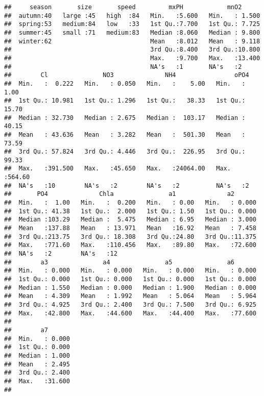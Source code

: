 \documentclass[
]{article}
\begin{document}
\begin{verbatim}
##     season       size       speed         mxPH            mnO2       
##  autumn:40   large :45   high  :84   Min.   :5.600   Min.   : 1.500  
##  spring:53   medium:84   low   :33   1st Qu.:7.700   1st Qu.: 7.725  
##  summer:45   small :71   medium:83   Median :8.060   Median : 9.800  
##  winter:62                           Mean   :8.012   Mean   : 9.118  
##                                      3rd Qu.:8.400   3rd Qu.:10.800  
##                                      Max.   :9.700   Max.   :13.400  
##                                      NA's   :1       NA's   :2       
##        Cl               NO3              NH4                oPO4       
##  Min.   :  0.222   Min.   : 0.050   Min.   :    5.00   Min.   :  1.00  
##  1st Qu.: 10.981   1st Qu.: 1.296   1st Qu.:   38.33   1st Qu.: 15.70  
##  Median : 32.730   Median : 2.675   Median :  103.17   Median : 40.15  
##  Mean   : 43.636   Mean   : 3.282   Mean   :  501.30   Mean   : 73.59  
##  3rd Qu.: 57.824   3rd Qu.: 4.446   3rd Qu.:  226.95   3rd Qu.: 99.33  
##  Max.   :391.500   Max.   :45.650   Max.   :24064.00   Max.   :564.60  
##  NA's   :10        NA's   :2        NA's   :2          NA's   :2       
##       PO4              Chla               a1              a2        
##  Min.   :  1.00   Min.   :  0.200   Min.   : 0.00   Min.   : 0.000  
##  1st Qu.: 41.38   1st Qu.:  2.000   1st Qu.: 1.50   1st Qu.: 0.000  
##  Median :103.29   Median :  5.475   Median : 6.95   Median : 3.000  
##  Mean   :137.88   Mean   : 13.971   Mean   :16.92   Mean   : 7.458  
##  3rd Qu.:213.75   3rd Qu.: 18.308   3rd Qu.:24.80   3rd Qu.:11.375  
##  Max.   :771.60   Max.   :110.456   Max.   :89.80   Max.   :72.600  
##  NA's   :2        NA's   :12                                        
##        a3               a4               a5               a6        
##  Min.   : 0.000   Min.   : 0.000   Min.   : 0.000   Min.   : 0.000  
##  1st Qu.: 0.000   1st Qu.: 0.000   1st Qu.: 0.000   1st Qu.: 0.000  
##  Median : 1.550   Median : 0.000   Median : 1.900   Median : 0.000  
##  Mean   : 4.309   Mean   : 1.992   Mean   : 5.064   Mean   : 5.964  
##  3rd Qu.: 4.925   3rd Qu.: 2.400   3rd Qu.: 7.500   3rd Qu.: 6.925  
##  Max.   :42.800   Max.   :44.600   Max.   :44.400   Max.   :77.600  
##                                                                     
##        a7        
##  Min.   : 0.000  
##  1st Qu.: 0.000  
##  Median : 1.000  
##  Mean   : 2.495  
##  3rd Qu.: 2.400  
##  Max.   :31.600  
## 
\end{verbatim}
\end{document}
